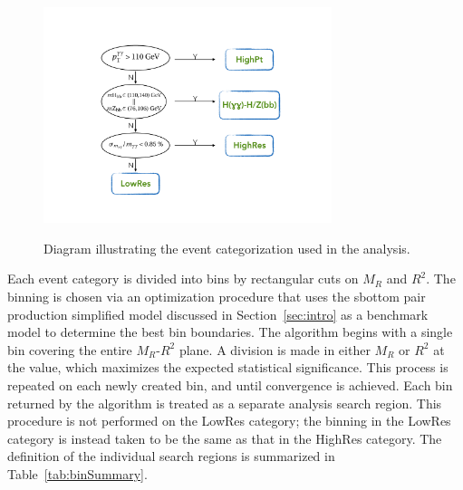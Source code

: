 \begin{figure}[ht!]
\centering
\includegraphics[width=0.75\textwidth,angle=0.]{figs/CategoriesDiagram_V2.pdf}\\
\caption{Diagram illustrating the event categorization used in the analysis.
\label{fig:categories}
}
\end{figure}


Each event category is divided into bins by rectangular cuts on
$M_{R}$ and $R^{2}$. The binning is chosen via an optimization procedure that uses 
the sbottom pair production simplified model discussed in Section~\ref{sec:intro}
as a benchmark model to determine the best bin boundaries. The algorithm begins with a
single bin covering the entire $M_{R}$-$R^{2}$ plane. A division is made in
either $M_{R}$ or $R^{2}$ at the value, which maximizes the expected statistical significance.  
This process is repeated on each newly created bin, and until convergence is achieved. Each bin returned by the algorithm is treated
as a separate analysis search region.  This procedure is not performed on the LowRes category; 
the binning in the LowRes category is instead taken to be the same as that in the HighRes category.
The definition of the individual search regions is summarized in 
Table~\ref{tab:binSummary}.



